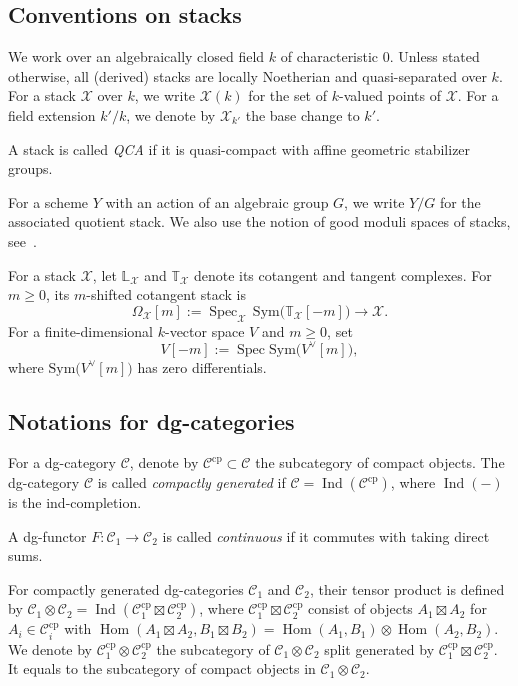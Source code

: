 \documentclass [11pt,oneside,a4paper,mathscr]{amsart}
\theoremstyle{definition}
\newcommand{\X}{\mathcal{X}}
\newcommand{\Ind}{\operatorname{Ind}}
\newcommand{\Hom}{\operatorname{Hom}}
\newcommand{\Spec}{\operatorname{Spec}}
\begin{document}
\subsection{Conventions on stacks}
We work over an algebraically closed field $k$ of characteristic $0$.
Unless stated otherwise, all (derived) stacks are locally Noetherian and quasi-separated over $k$.
For a stack $\X$ over $k$, we write $\X(k)$ for the set of $k$-valued points of $\X$.
For a field extension $k'/k$, we denote by $\X_{k'}$ the base change to $k'$.

A stack is called \textit{QCA} if it is quasi-compact with affine geometric stabilizer groups.

For a scheme $Y$ with an action of an algebraic group $G$, we write $Y/G$ for the associated quotient stack.
We also use the notion of good moduli spaces of stacks, see~\cite{MR3237451}.

For a stack $\X$, let $\mathbb{L}_{\X}$ and $\mathbb{T}_{\X}$ denote its cotangent and tangent complexes.
For $m \ge 0$, its $m$-shifted cotangent stack is
\[
  \Omega_{\X}[m] := \Spec_{\X}\,\mathrm{Sym}\big(\mathbb{T}_{\X}[-m]\big) \longrightarrow \X .
\]
For a finite-dimensional $k$-vector space $V$ and $m \ge 0$, set
\[
  V[-m] := \Spec \mathrm{Sym}\big(V^{\vee}[m]\big),
\]
where $\mathrm{Sym}\big(V^{\vee}[m]\big)$ has zero differentials.


\subsection{Notations for dg-categories}
For a dg-category $\mathcal{C}$, denote by $\mathcal{C}^{\mathrm{cp}} \subset \mathcal{C}$ the subcategory of compact objects. The dg-category $\mathcal{C}$ is called \textit{compactly generated} if $\mathcal{C}=\Ind(\mathcal{C}^{\mathrm{cp}})$, where $\Ind(-)$ is the ind-completion. 

A dg-functor $F \colon \mathcal{C}_1 \to \mathcal{C}_2$ is called \textit{continuous} 
if it commutes with taking direct sums. 

For compactly generated dg-categories $\mathcal{C}_1$ and $\mathcal{C}_2$, their 
tensor product is defined by $\mathcal{C}_1 \otimes \mathcal{C}_2=\Ind(\mathcal{C}_1^{\mathrm{cp}}\boxtimes \mathcal{C}_2^{\mathrm{cp}})$, 
where $\mathcal{C}_1^{\mathrm{cp}}\boxtimes \mathcal{C}_2^{\mathrm{cp}}$ consist
of objects $A_1\boxtimes A_2$ for $A_i \in \mathcal{C}_i^{\mathrm{cp}}$ with 
$\Hom(A_1\boxtimes A_2, B_1\boxtimes B_2)=\Hom(A_1, B_1)\otimes \Hom(A_2, B_2)$.
We denote by $\mathcal{C}_1^{\mathrm{cp}}\otimes \mathcal{C}_2^{\mathrm{cp}}$ the subcategory 
of $\mathcal{C}_1\otimes \mathcal{C}_2$ split generated by $\mathcal{C}_1^{\mathrm{cp}}\boxtimes \mathcal{C}_2^{\mathrm{cp}}$. It equals to the subcategory of compact objects in $\mathcal{C}_1 \otimes \mathcal{C}_2$.
\end{document}
